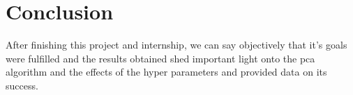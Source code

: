 
\section{Conclusion}

After finishing this project and internship, we can say objectively that it's goals were fulfilled and the results obtained shed important light onto the \acrshort{pca} algorithm and the effects of the hyper parameters and provided data on its success.





